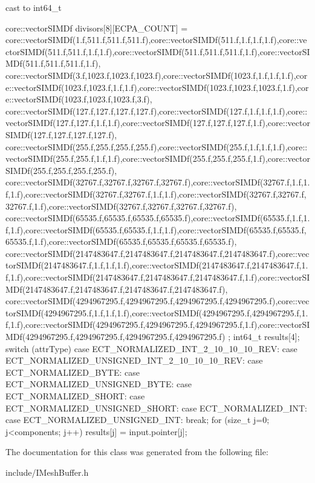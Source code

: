 cast to int64\+\_\+t \begin{DoxyVerb}        core::vectorSIMDf divisors[8][ECPA_COUNT] = {
            {core::vectorSIMDf(1.f,511.f,511.f,511.f),core::vectorSIMDf(511.f,1.f,1.f,1.f),core::vectorSIMDf(511.f,511.f,1.f,1.f),core::vectorSIMDf(511.f,511.f,511.f,1.f),core::vectorSIMDf(511.f,511.f,511.f,1.f)},
            {core::vectorSIMDf(3.f,1023.f,1023.f,1023.f),core::vectorSIMDf(1023.f,1.f,1.f,1.f),core::vectorSIMDf(1023.f,1023.f,1.f,1.f),core::vectorSIMDf(1023.f,1023.f,1023.f,1.f),core::vectorSIMDf(1023.f,1023.f,1023.f,3.f)},
            {core::vectorSIMDf(127.f,127.f,127.f,127.f),core::vectorSIMDf(127.f,1.f,1.f,1.f),core::vectorSIMDf(127.f,127.f,1.f,1.f),core::vectorSIMDf(127.f,127.f,127.f,1.f),core::vectorSIMDf(127.f,127.f,127.f,127.f)},
            {core::vectorSIMDf(255.f,255.f,255.f,255.f),core::vectorSIMDf(255.f,1.f,1.f,1.f),core::vectorSIMDf(255.f,255.f,1.f,1.f),core::vectorSIMDf(255.f,255.f,255.f,1.f),core::vectorSIMDf(255.f,255.f,255.f,255.f)},
            {core::vectorSIMDf(32767.f,32767.f,32767.f,32767.f),core::vectorSIMDf(32767.f,1.f,1.f,1.f),core::vectorSIMDf(32767.f,32767.f,1.f,1.f),core::vectorSIMDf(32767.f,32767.f,32767.f,1.f),core::vectorSIMDf(32767.f,32767.f,32767.f,32767.f)},
            {core::vectorSIMDf(65535.f,65535.f,65535.f,65535.f),core::vectorSIMDf(65535.f,1.f,1.f,1.f),core::vectorSIMDf(65535.f,65535.f,1.f,1.f),core::vectorSIMDf(65535.f,65535.f,65535.f,1.f),core::vectorSIMDf(65535.f,65535.f,65535.f,65535.f)},
            {core::vectorSIMDf(2147483647.f,2147483647.f,2147483647.f,2147483647.f),core::vectorSIMDf(2147483647.f,1.f,1.f,1.f),core::vectorSIMDf(2147483647.f,2147483647.f,1.f,1.f),core::vectorSIMDf(2147483647.f,2147483647.f,2147483647.f,1.f),core::vectorSIMDf(2147483647.f,2147483647.f,2147483647.f,2147483647.f)},
            {core::vectorSIMDf(4294967295.f,4294967295.f,4294967295.f,4294967295.f),core::vectorSIMDf(4294967295.f,1.f,1.f,1.f),core::vectorSIMDf(4294967295.f,4294967295.f,1.f,1.f),core::vectorSIMDf(4294967295.f,4294967295.f,4294967295.f,1.f),core::vectorSIMDf(4294967295.f,4294967295.f,4294967295.f,4294967295.f)}
        };
        int64_t results[4];
        switch (attrType)
        {
            case ECT_NORMALIZED_INT_2_10_10_10_REV:
            case ECT_NORMALIZED_UNSIGNED_INT_2_10_10_10_REV:
            case ECT_NORMALIZED_BYTE:
            case ECT_NORMALIZED_UNSIGNED_BYTE:
            case ECT_NORMALIZED_SHORT:
            case ECT_NORMALIZED_UNSIGNED_SHORT:
            case ECT_NORMALIZED_INT:
            case ECT_NORMALIZED_UNSIGNED_INT:
                break;
        }
        for (size_t j=0; j<components; j++)
            results[j] = input.pointer[j]; \end{DoxyVerb}


The documentation for this class was generated from the following file\+:\begin{DoxyCompactItemize}
\item 
include/I\+Mesh\+Buffer.\+h\end{DoxyCompactItemize}
